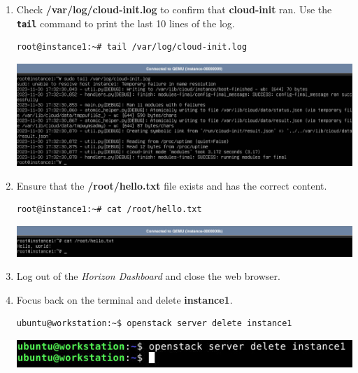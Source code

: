 \documentclass[letterpaper, 12pt]{article}
\begin{document}
\begin{enumerate}
    \item Check \textbf{/var/log/cloud-init.log} to confirm that \textbf{cloud-init} ran. Use the \textbf{\texttt{tail}}
    command to print the last 10 lines of the log.
\begin{lstlisting}
root@instance1:~# tail /var/log/cloud-init.log
\end{lstlisting}

    \begin{center}
        \includegraphics[width=\linewidth]{images/part1/step30.png}
    \end{center}

    \item Ensure that the \textbf{/root/hello.txt} file exists and has the correct content.
\begin{lstlisting}
root@instance1:~# cat /root/hello.txt
\end{lstlisting}

    \begin{center}
        \includegraphics[width=\linewidth]{images/part1/step31.png}
    \end{center}

    \item Log out of the \textit{Horizon Dashboard} and close the web browser.

    \item Focus back on the terminal and delete \textbf{instance1}.
\begin{lstlisting}
ubuntu@workstation:~$ openstack server delete instance1
\end{lstlisting}

    \begin{center}
        \includegraphics[width=\linewidth]{images/part1/step33.png}
    \end{center}


\end{enumerate}
\end{document}
